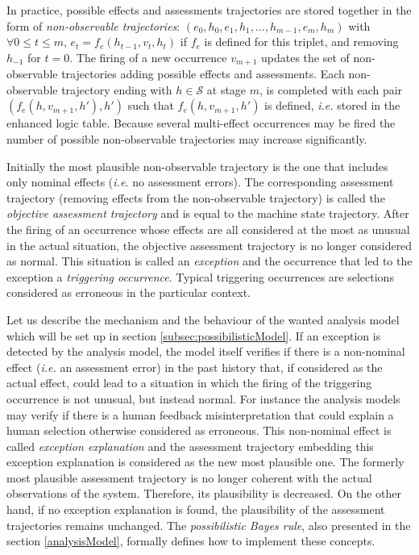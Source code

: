 In practice, possible effects and assessments trajectories 
are stored together in the form of 
\textit{non-observable trajectories}: 
$(e_0,h_0,e_1,h_1, \ldots, h_{m-1}, e_m, h_m)$ with 
$\forall 0 \leqslant t \leqslant m$, $e_t = f_e(h_{t-1},v_{t},h_t)$
if $f_e$ is defined for this triplet, 
and removing $h_{-1}$ for $t=0$.
The firing of a new occurrence $v_{m+1}$ updates 
the set of non-observable trajectories 
adding possible effects and assessments.
Each non-observable trajectory ending with 
$h \in \mathcal{S}$ at stage $m$, is completed with each pair 
$(f_e(h,v_{m+1},h'),h')$ such that $f_e(h,v_{m+1},h')$ is defined,
\textit{i.e.} stored in the enhanced logic table. 
Because several multi-effect occurrences may be fired the number of possible 
non-observable trajectories may increase significantly.

Initially the most plausible non-observable trajectory is the one that includes only 
nominal effects (\textit{i.e.} no assessment errors). 
The corresponding assessment trajectory 
(removing effects from the non-observable trajectory) 
is called the {\em objective assessment trajectory} 
and is equal to the machine state trajectory. 
After the firing of an occurrence 
whose effects are all considered at the most as unusual 
in the actual situation, 
the objective assessment trajectory 
is no longer considered as normal. 
This situation is called an {\em exception} 
and the occurrence that led to the exception 
a {\em triggering occurrence}. 
Typical triggering occurrences are selections 
considered as erroneous in the particular context. 

Let us describe the mechanism and the behaviour
of the wanted analysis model which will be set up in section \ref{subsec:possibilisticModel}. 
If an exception is detected by the analysis model, 
the model itself verifies if there is a non-nominal effect 
(\textit{i.e.} an assessment error) in the past history that, 
if considered as the actual effect, 
could lead to a situation in which the firing of the triggering occurrence 
is not unusual, but instead normal. 
For instance the analysis models may verify 
if there is a human feedback misinterpretation 
that could explain a human selection otherwise considered as erroneous. 
This non-nominal effect is called \textit{exception explanation} 
and the assessment trajectory embedding this exception explanation 
is considered as the new most plausible one. 
The formerly most plausible assessment trajectory 
is no longer coherent with the actual observations of the system. 
Therefore, its plausibility is decreased. 
On the other hand, if no exception explanation is found, 
the plausibility of the assessment trajectories remains unchanged.
The \textit{possibilistic Bayes rule}, 
also presented in the section \ref{analysisModel},
formally defines how to implement these concepts. 

